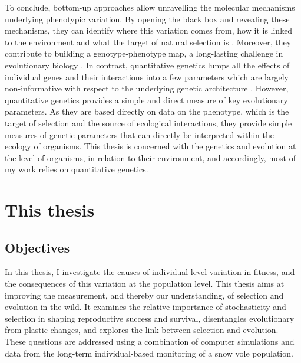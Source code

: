 To conclude, bottom-up approaches allow unravelling the molecular mechanisms underlying phenotypic variation. By opening the black box and revealing these mechanisms, they can identify where this variation comes from, how it is linked to the environment and what the target of natural selection is \parencite{DeJong2014}. Moreover, they contribute to building a genotype-phenotype map, a long-lasting challenge in evolutionary biology \parencite{Kirschner2010}.
In contrast, quantitative genetics lumps all the effects of individual genes and their interactions into a few parameters which are largely non-informative with respect to the underlying genetic architecture \parencite{Mackay2001,Nietlisbach2015,Huang041434}. However, quantitative genetics provides a simple and direct measure of key evolutionary parameters. As they are based directly on data on the phenotype, which is the target of selection and the source of ecological interactions, they provide simple measures of genetic parameters that can directly be interpreted within the ecology of organisms.
This thesis is concerned with the genetics and evolution at the level of organisms, in relation to their environment, and accordingly, most of my work relies on quantitative genetics.

\section{This thesis}
\subsection{Objectives}
In this thesis, I investigate the causes of individual-level variation in fitness, and the consequences of this variation at the population level. This thesis aims at improving the measurement, and thereby our understanding, of selection and evolution in the wild. It examines the relative importance of stochasticity and selection in shaping reproductive success and survival, disentangles evolutionary from plastic changes, and explores the link between selection and evolution. These questions are addressed using a combination of computer simulations and data from the long-term individual-based monitoring of a snow vole population.

